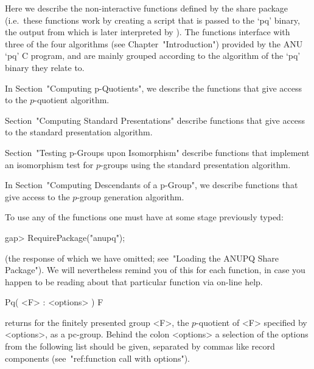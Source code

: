 

Here we describe the non-interactive functions defined  by  the  {\ANUPQ}
share package (i.e.~these functions work by creating  a  script  that  is
passed to the `pq' binary, the output from which is later interpreted  by
{\GAP}). The functions interface with three of the four  algorithms  (see
Chapter~"Introduction") provided by the  ANU  `pq'  C  program,  and  are
mainly grouped according to the algorithm of the `pq' binary they  relate
to.

In Section~"Computing p-Quotients", we describe the functions  that  give
access to the $p$-quotient algorithm.

Section~"Computing Standard Presentations" describe functions  that  give
access to the standard presentation algorithm.

Section~"Testing  p-Groups  upon  Isomorphism"  describe  functions  that
implement  an  isomorphism  test  for  $p$-groups  using   the   standard
presentation algorithm.

In Section~"Computing Descendants of a p-Group",  we  describe  functions
that give access to the $p$-group generation algorithm.

To use any of the functions one must have at some stage previously typed:

\beginexample
gap> RequirePackage("anupq");
\endexample

(the response of which we have  omitted;  see~"Loading  the  ANUPQ  Share
Package"). We will nevertheless remind you of this for each function,  in
case you happen to be reading about that particular function via  on-line
help.


\>Pq( <F> : <options> ) F

returns for the finitely presented group <F>,  the  $p$-quotient  of  <F>
specified by <options>, as a  pc-group.  Behind  the  colon  <options>  a
selection of the  options  from  the  following  list  should  be  given,
separated by commas like record components (see~"ref:function  call  with
options").


